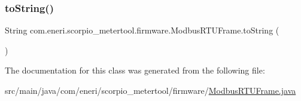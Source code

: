 \subsubsection{\texorpdfstring{to\+String()}{toString()}}
{\footnotesize\ttfamily String com.\+eneri.\+scorpio\+\_\+metertool.\+firmware.\+Modbus\+R\+T\+U\+Frame.\+to\+String (\begin{DoxyParamCaption}{ }\end{DoxyParamCaption})}



The documentation for this class was generated from the following file\+:\begin{DoxyCompactItemize}
\item 
src/main/java/com/eneri/scorpio\+\_\+metertool/firmware/\hyperlink{_modbus_r_t_u_frame_8java}{Modbus\+R\+T\+U\+Frame.\+java}\end{DoxyCompactItemize}
